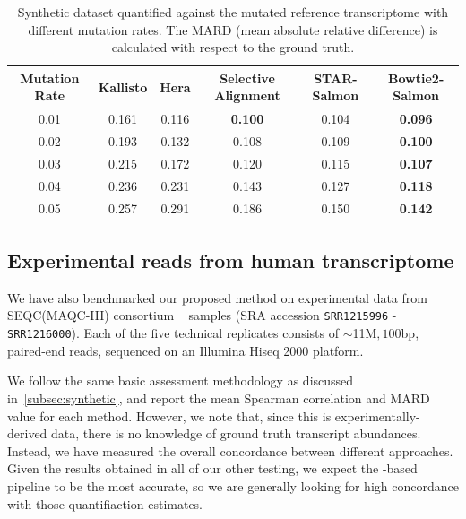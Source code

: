 \begin{table}
\begin{center}
\begin{tabular} {c|c c c c c}
\toprule
Mutation Rate & Kallisto & Hera & Selective Alignment & STAR-Salmon &Bowtie2-Salmon \\
\midrule
  0.01 & 0.161 & 0.116 & \textbf{0.100} & 0.104 & \textbf{0.096}\\
  0.02 & 0.193 & 0.132 & 0.108 & 0.109 & \textbf{0.100}\\
  0.03 & 0.215 & 0.172 & 0.120 & 0.115 & \textbf{0.107}\\
  0.04 & 0.236 & 0.231 & 0.143 & 0.127 & \textbf{0.118}\\
  0.05 & 0.257 & 0.291 & 0.186 & 0.150 & \textbf{0.142}\\
\bottomrule
\end{tabular}
\caption[MARD of qunatification of synthetic dataset against the mutated reference transcriptome]{
  {Synthetic dataset quantified against the mutated reference transcriptome with different mutation rates. 
  The MARD (mean absolute relative difference) is calculated with respect to the ground truth.}
}
\vspace{-0.3in}
\label{tab:diff_mutation}
\end{center}
\end{table}


\subsection{Experimental reads from human transcriptome}\label{res:experimental}

We have also benchmarked our proposed \sla method on experimental data from SEQC(MAQC-III) 
consortium ~\citep{seqc2014comprehensive} samples (SRA accession \texttt{SRR1215996} - \texttt{SRR1216000}). 
Each of the five technical replicates consists of $\sim$11M$, 100$bp, paired-end reads, sequenced on an 
Illumina Hiseq 2000 platform.

We follow the same basic assessment methodology as discussed in~\cref{subsec:synthetic}, and report the mean 
Spearman correlation and MARD value for each method. However, we note that, since this is experimentally-derived 
data, there is no knowledge of ground truth transcript abundances.  Instead, we have measured the overall 
concordance between different approaches. Given the results obtained in all of our other testing, we expect 
the \bt-based pipeline to be the most accurate, so we are generally looking for high concordance with those 
quantifiaction estimates.

